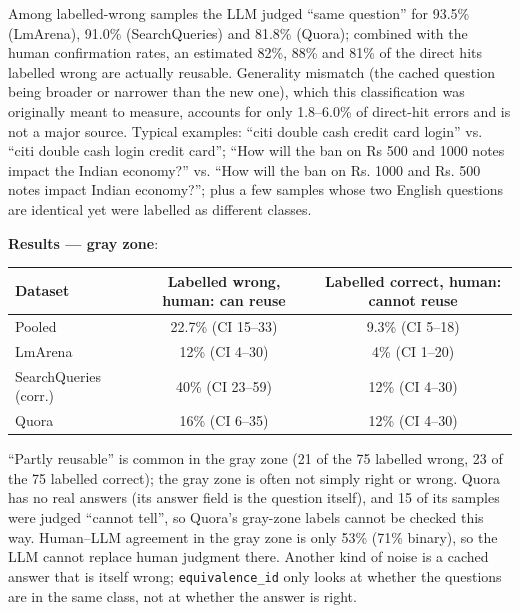 \documentclass[11pt]{article}
\newenvironment{fittab}{\begin{lrbox}{\fittabbox}}{\end{lrbox}%
  \ifdim\wd\fittabbox>\linewidth\resizebox{\linewidth}{!}{\usebox{\fittabbox}}\else\usebox{\fittabbox}\fi}
\begin{document}
Among labelled-wrong samples the LLM judged ``same question'' for 93.5\% (LmArena), 91.0\% (SearchQueries) and 81.8\% (Quora); combined with the human confirmation rates, an estimated 82\%, 88\% and 81\% of the direct hits labelled wrong are actually reusable. Generality mismatch (the cached question being broader or narrower than the new one), which this classification was originally meant to measure, accounts for only 1.8–6.0\% of direct-hit errors and is not a major source. Typical examples: ``citi double cash credit card login'' vs. ``citi double cash login credit card''; ``How will the ban on Rs 500 and 1000 notes impact the Indian economy?'' vs. ``How will the ban on Rs. 1000 and Rs. 500 notes impact Indian economy?''; plus a few samples whose two English questions are identical yet were labelled as different classes.

\textbf{Results — gray zone}:

\begin{center}
\small
\begin{fittab}\begin{tabular}{@{}lcc@{}}
\toprule
\textbf{Dataset} & \textbf{Labelled wrong, human: can reuse} & \textbf{Labelled correct, human: cannot reuse} \\
\midrule
Pooled & 22.7\% (CI 15--33) & 9.3\% (CI 5--18) \\
LmArena & 12\% (CI 4--30) & 4\% (CI 1--20) \\
SearchQueries (corr.) & 40\% (CI 23--59) & 12\% (CI 4--30) \\
Quora & 16\% (CI 6--35) & 12\% (CI 4--30) \\
\bottomrule
\end{tabular}\end{fittab}
\end{center}

``Partly reusable'' is common in the gray zone (21 of the 75 labelled wrong, 23 of the 75 labelled correct); the gray zone is often not simply right or wrong. Quora has no real answers (its answer field is the question itself), and 15 of its samples were judged ``cannot tell'', so Quora's gray-zone labels cannot be checked this way. Human–LLM agreement in the gray zone is only 53\% (71\% binary), so the LLM cannot replace human judgment there. Another kind of noise is a cached answer that is itself wrong; \texttt{equivalence\_\allowbreak{}id} only looks at whether the questions are in the same class, not at whether the answer is right.
\end{document}
